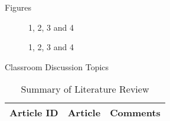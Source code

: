 \begin{frame}[t]
\begin{columns}[t]
\begin{column}{\onecolwid}
\begin{alertblock}{Figures}
\begin{figure}[H]
	\centering
	\begin{minipage}[b]{0.5\linewidth}
	\end{minipage}\hfill
	\begin{minipage}[b]{0.5\linewidth}
	\end{minipage}\hfill	
	\begin{minipage}[b]{0.5\linewidth}
	\end{minipage}\hfill
	\begin{minipage}[b]{0.5\linewidth}
	\end{minipage}\hfill
	\caption{1, 2, 3 and 4}
	\label{fig:Figure1}
\end{figure} 

\begin{figure}[H]
	\centering
	\begin{minipage}[b]{0.5\linewidth}
	\end{minipage}\hfill
	\begin{minipage}[b]{0.5\linewidth}
	\end{minipage}\hfill	
	\begin{minipage}[b]{0.5\linewidth}
	\end{minipage}\hfill
	\begin{minipage}[b]{0.5\linewidth}
	\end{minipage}\hfill
	\caption{1, 2, 3 and 4}
	\label{fig:Figure1}
\end{figure} 


\end{alertblock}
\begin{alertblock}{Classroom Discussion Topics}

\begin{table}[H]
	\centering
	\begin{tabular}{r|p{12cm}|l}
	\hline
	Article ID  & Article & Comments \\
	\hline
	\hline
	\end{tabular}
	\caption{Summary of Literature Review}
\end{table} 




\end{alertblock}
\end{column}
\end{columns}
\end{frame}
